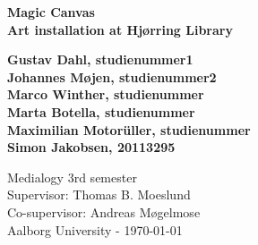 \thispagestyle{empty} %
\hspace{6cm} \vspace{6cm}
\begin{center}
\textbf{\Huge {Magic Canvas}\\ \vspace{1cm}
\huge{Art installation at Hj{\o}rring Library}}
\end{center}
\vspace{1cm}
\begin{center}
\Large{\textbf{Gustav Dahl, studienummer1 \\ Johannes M{\o}jen, studienummer2
\\ Marco Winther, studienummer \\ Marta Botella, studienummer \\ Maximilian Motor\"uller, studienummer
\\ Simon Jakobsen, 20113295}}
\end{center}
\vfill
Medialogy 3rd semester\\
Supervisor: Thomas B. Moeslund\\
Co-supervisor: Andreas M{\o}gelmose\\
Aalborg University - \today
\thispagestyle{empty}
\setcounter{page}{0}